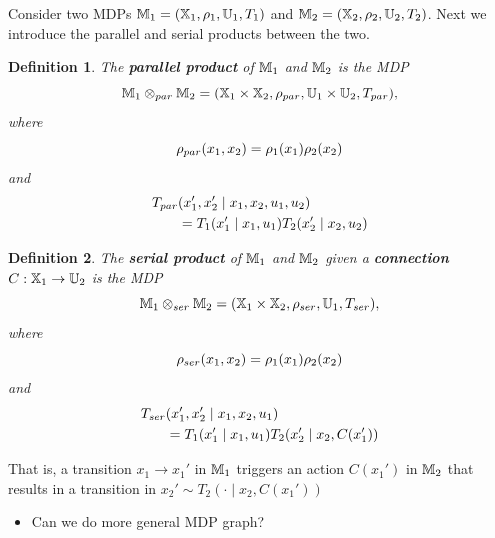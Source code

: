 \documentclass[conference]{IEEEtran}
\newtheorem{definition}{Definition}
\newcommand{\red}[1]{{\color{red} #1 }}
\begin{document}
Consider two MDPs $\mathbb{M}_1 = (\mathbb{X}_1, \rho_1, \mathbb{U}_1, T_1)$ and $\mathbb{M}_2 = (\mathbb{X}_2, \rho_2, \mathbb{U}_2, T_2)$. Next we introduce the parallel and serial products between the two.
\begin{definition}
  The \textbf{parallel product} of $\mathbb{M}_1$ and $\mathbb{M}_2$ is the MDP 
  \begin{equation}
    \mathbb{M}_1 \otimes_{par} \mathbb{M}_2 = (\mathbb{X}_1 \times \mathbb{X}_2, \rho_{par}, \mathbb{U}_1 \times \mathbb{U}_2, T_{par}),
  \end{equation}
  where
  \begin{equation}
    \rho_{par}(x_1, x_2) = \rho_1(x_1) \rho_2(x_2)
  \end{equation}
  and
  \begin{equation}
  \begin{aligned}
      T_{par}&(x_1', x_2' \mid x_1, x_2, u_1, u_2) \\
      & = T_1 (x_1' \mid x_1, u_1) T_2 (x_2' \mid x_2, u_2)
  \end{aligned}
  \end{equation}
\end{definition}

\begin{definition}
  The \textbf{serial product} of $\mathbb{M}_1$ and $\mathbb{M}_2$ given a \textbf{connection} $C : \mathbb{X}_1 \rightarrow \mathbb{U}_2$ is the MDP 
  \begin{equation}
    \mathbb{M}_1 \otimes_{ser} \mathbb{M}_2 = (\mathbb{X}_1 \times \mathbb{X}_2, \rho_{ser}, \mathbb{U}_1, T_{ser}),
  \end{equation}
  where
  \begin{equation}
    \rho_{ser}(x_1, x_2) = \rho_1(x_1) \rho_2(x_2)
  \end{equation}
  and
  \begin{equation}
  \begin{aligned}
      T_{ser}&(x_1', x_2' \mid x_1, x_2, u_1) \\
      & = T_1 (x_1' \mid x_1, u_1) T_2 (x_2' \mid x_2, C(x_1') )
  \end{aligned}
  \end{equation}
\end{definition}
That is, a transition $x_1 \rightarrow x_1'$ in $\mathbb{M}_1$ triggers an action $C(x_1')$ in $\mathbb{M}_2$ that results in a transition in $x_2' \sim T_2(\cdot \mid x_2, C(x_1'))$

\begin{itemize}
  \item \red{Can we do more general MDP graph?}
\end{itemize}
\end{document}
